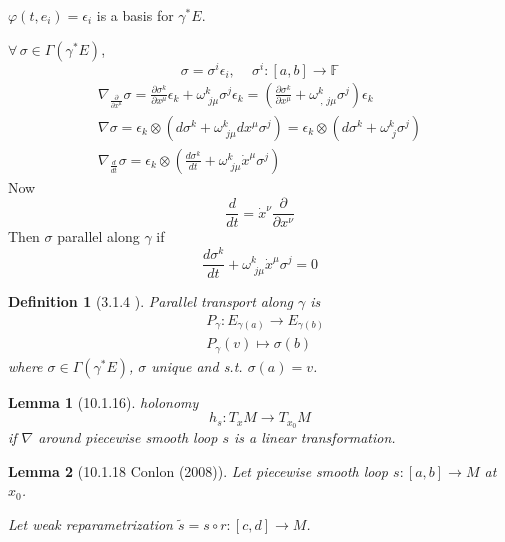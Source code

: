 \documentclass[10pt]{amsart}
\newtheorem{lemma}{Lemma}
\newtheorem{definition}{Definition}
\begin{document}
\begin{multicols*}{2}
$\varphi(t,e_i) = \epsilon_i$ is a basis for $\gamma^* E$.  

$\forall \, \sigma \in \Gamma(\gamma^*E)$,  
\[
\sigma  = \sigma^i \epsilon_i, \quad \, \sigma^i: [a,b] \to \mathbb{F}
\]
\[
\begin{gathered}
	\nabla_{ \frac{ \partial }{ \partial x^{\mu} } } \sigma = \frac{ \partial \sigma^k}{ \partial x^{\mu}  } \epsilon_k + \omega^k_{ \, \, j \mu } \sigma^j \epsilon_k = \left( \frac{ \partial \sigma ^k }{ \partial x^{\mu } } + \omega^k_{ \ , \, j \mu} \sigma^j  \right)  \epsilon_k \\ 
 \nabla \sigma = \epsilon_k \otimes ( d\sigma^k + \omega^k_{ \, \, j \mu} dx^{\mu} \sigma^j ) = \epsilon_k \otimes (d\sigma^k + \omega^k_{ \, \, j} \sigma^j  )  \\
 \nabla_{ \frac{d}{dt} } \sigma = \epsilon_k \otimes \left( \frac{d\sigma^k }{ dt } + \omega^k_{ \, \, j \mu } \dot{x}^{\mu} \sigma^j  \right)
\end{gathered}
\]
Now
\[
\frac{d}{dt} = \dot{x}^{\nu} \frac{ \partial }{ \partial x^{\nu } }
\]
Then $\sigma$ parallel along $\gamma$ if 
\[
\frac{ d\sigma^k}{ dt} + \omega^k_{ \, \, j\mu} \dot{x}^{\mu} \sigma^j = 0 
\]
\begin{definition}[3.1.4 \cite{ClSa2012}]  Parallel transport along $\gamma$ is 
\begin{equation}
\begin{aligned}
	& P_{\gamma} : E_{\gamma(a)} \to E_{\gamma(b)} \\ 
	& P_{\gamma}(v) \mapsto \sigma(b)
\end{aligned}
\end{equation}
where $\sigma \in \Gamma(\gamma^*E)$, $\sigma$ unique and s.t. $\sigma(a)=v$.  
\end{definition}







\begin{lemma}[10.1.16\cite{Conl2008}]
	holonomy 
	\[
	h_s:T_xM \to T_{x_0}M
	\]
	if $\nabla$ around piecewise smooth loop $s$ is a linear transformation.  
\end{lemma}






\begin{lemma}[10.1.18 Conlon (2008)\cite{Conl2008}] 
	Let piecewise smooth loop $s:[a,b] \to M$ at $x_0$.  

Let weak reparametrization $\widetilde{s} = s\circ r: [c,d] \to M$.  


\end{lemma}
\end{multicols*}
\end{document}
